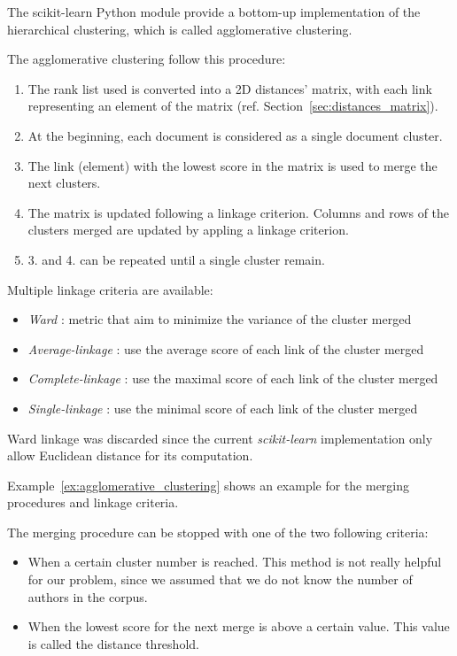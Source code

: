 The scikit-learn Python module \cite{sklearn} provide a bottom-up implementation of the hierarchical clustering, which is called agglomerative clustering.

The agglomerative clustering follow this procedure:
\begin{enumerate}
  \item The rank list used is converted into a 2D distances' matrix, with each link representing an element of the matrix (ref. Section~\ref{sec:distances_matrix}).
  \item At the beginning, each document is considered as a single document cluster.
  \item The link (element) with the lowest score in the matrix is used to merge the next clusters.
  \item The matrix is updated following a linkage criterion. Columns and rows of the clusters merged are updated by appling a linkage criterion.
  \item 3. and 4. can be repeated until a single cluster remain.
\end{enumerate}

Multiple linkage criteria are available:

\begin{itemize}
  \item
  \textit{Ward} : metric that aim to minimize the variance of the cluster merged
  \item
  \textit{Average-linkage} : use the average score of each link of the cluster merged
  \item
  \textit{Complete-linkage} : use the maximal score of each link of the cluster merged
  \item
  \textit{Single-linkage} : use the minimal score of each link of the cluster merged
\end{itemize}

Ward linkage was discarded since the current \textit{scikit-learn} implementation only allow Euclidean distance for its computation.

Example~\ref{ex:agglomerative_clustering} shows an example for the merging procedures and linkage criteria.

The merging procedure can be stopped with one of the two following criteria:

\begin{itemize}
  \item
  When a certain cluster number is reached. This method is not really helpful for our problem, since we assumed that we do not know the number of authors in the corpus.
  \item
  When the lowest score for the next merge is above a certain value. This value is called the distance threshold.
\end{itemize}


